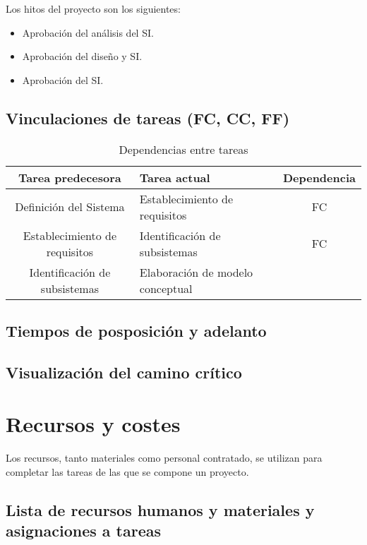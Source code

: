 \documentclass[11pt,a4paper,spanish,twoside]{report}
\begin{document}
Los hitos del proyecto son los siguientes:
\begin{itemize}
\item Aprobación del análisis del SI.
\item Aprobación del diseño y SI.
\item Aprobación del SI.
\end{itemize}

\section{Vinculaciones de tareas (FC, CC, FF)}
\begin{table}[!h]
\centering
\small
  \begin{tabular}{c|p{5cm}|c}
    \textbf{Tarea predecesora} & \textbf{Tarea actual} & \textbf{Dependencia} \\
    \hline \hline
    Definición del Sistema & Establecimiento de requisitos & FC \\
    Establecimiento de requisitos & Identificación de subsistemas & FC \\
    Identificación de subsistemas & Elaboración de modelo conceptual & 
    
  \end{tabular}
  \caption{Dependencias entre tareas} \label{Tab:Dep}
\end{table}

\section{Tiempos de posposición y adelanto}

\section{Visualización del camino crítico}

\chapter{Recursos y costes}
Los recursos, tanto materiales como personal contratado, se utilizan para
completar las tareas de las que se compone un proyecto. 


\section{Lista de recursos humanos y materiales y asignaciones a 
  tareas}
\end{document}
